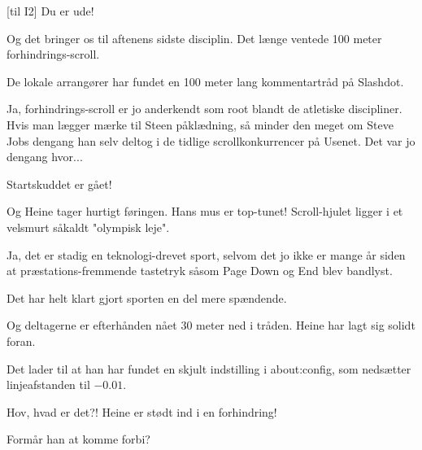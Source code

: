 \documentclass[a4paper,11pt]{article}
\begin{document}
\begin{sketch}
  [til I2] Du er ude!



   Og det bringer os til aftenens sidste disciplin. Det længe ventede
  100 meter forhindrings-scroll.


   De lokale arrangører har fundet en 100 meter lang kommentartråd på
  Slashdot.

   Ja, forhindrings-scroll er jo anderkendt som root blandt
  de atletiske discipliner.  Hvis man lægger mærke til Steen
  påklædning, så minder den meget om Steve Jobs dengang han selv
  deltog i de tidlige scrollkonkurrencer på Usenet.  Det var jo
  dengang hvor...


   Startskuddet er gået!

   Og Heine tager hurtigt føringen. Hans mus er top-tunet!
  Scroll-hjulet ligger i et velsmurt såkaldt "olympisk leje".

   Ja, det er stadig en teknologi-drevet sport, selvom det jo
  ikke er mange år siden at præstations-fremmende tastetryk såsom Page
  Down og End blev bandlyst.

   Det har helt klart gjort sporten en del mere spændende.

   Og deltagerne er efterhånden nået 30 meter ned i tråden. Heine har
  lagt sig solidt foran.

   Det lader til at han har fundet en skjult indstilling i
  about:config, som nedsætter linjeafstanden til $-0.01$.


   Hov, hvad er det?! Heine er stødt ind i en forhindring!


   Formår han at komme forbi?



\end{sketch}
\end{document}
